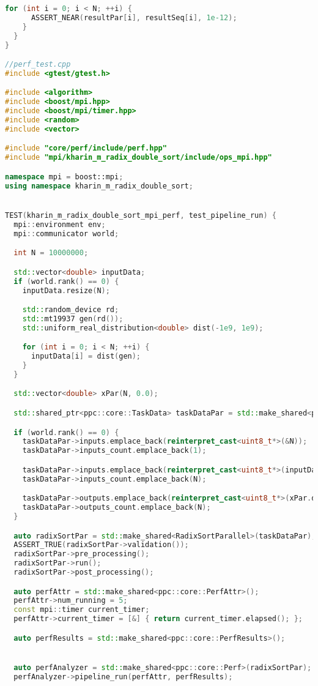 \documentclass[a4paper,12pt]{article}
\begin{document}
\begin{lstlisting}[language=C++, caption={Тесты}]
    for (int i = 0; i < N; ++i) {
      ASSERT_NEAR(resultPar[i], resultSeq[i], 1e-12);
    }
  }
}

//perf_test.cpp
#include <gtest/gtest.h>

#include <algorithm>
#include <boost/mpi.hpp>
#include <boost/mpi/timer.hpp>
#include <random>
#include <vector>

#include "core/perf/include/perf.hpp"
#include "mpi/kharin_m_radix_double_sort/include/ops_mpi.hpp"

namespace mpi = boost::mpi;
using namespace kharin_m_radix_double_sort;


TEST(kharin_m_radix_double_sort_mpi_perf, test_pipeline_run) {
  mpi::environment env;
  mpi::communicator world;

  int N = 10000000;

  std::vector<double> inputData;
  if (world.rank() == 0) {
    inputData.resize(N);

    std::random_device rd;
    std::mt19937 gen(rd());
    std::uniform_real_distribution<double> dist(-1e9, 1e9);

    for (int i = 0; i < N; ++i) {
      inputData[i] = dist(gen);
    }
  }

  std::vector<double> xPar(N, 0.0);

  std::shared_ptr<ppc::core::TaskData> taskDataPar = std::make_shared<ppc::core::TaskData>();

  if (world.rank() == 0) {
    taskDataPar->inputs.emplace_back(reinterpret_cast<uint8_t*>(&N));
    taskDataPar->inputs_count.emplace_back(1);

    taskDataPar->inputs.emplace_back(reinterpret_cast<uint8_t*>(inputData.data()));
    taskDataPar->inputs_count.emplace_back(N);

    taskDataPar->outputs.emplace_back(reinterpret_cast<uint8_t*>(xPar.data()));
    taskDataPar->outputs_count.emplace_back(N);
  }

  auto radixSortPar = std::make_shared<RadixSortParallel>(taskDataPar);
  ASSERT_TRUE(radixSortPar->validation());
  radixSortPar->pre_processing();
  radixSortPar->run();
  radixSortPar->post_processing();

  auto perfAttr = std::make_shared<ppc::core::PerfAttr>();
  perfAttr->num_running = 5; 
  const mpi::timer current_timer;
  perfAttr->current_timer = [&] { return current_timer.elapsed(); };

  auto perfResults = std::make_shared<ppc::core::PerfResults>();


  auto perfAnalyzer = std::make_shared<ppc::core::Perf>(radixSortPar);
  perfAnalyzer->pipeline_run(perfAttr, perfResults);


\end{lstlisting}
\end{document}
